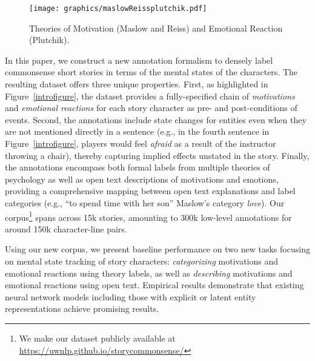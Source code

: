 \documentclass[11pt,a4paper]{article}
\begin{document}
\begin{figure*}[t]
    \centering
    \hspace{-25pt}
    \texttt{[image: graphics/maslowReissplutchik.pdf]}
    \vspace*{-6mm}
    \caption{Theories of Motivation (Maslow and Reiss) and Emotional Reaction (Plutchik).}
    \label{fig:annot_categories}
\end{figure*}

In this paper, we construct a new annotation formalism to densely label commonsense short stories \citep{Mostafazadeh2016-ei} in terms of the mental states of the characters. 
The resulting dataset offers three unique properties. 
First, as highlighted in Figure~\ref{introfigure}, the dataset provides a fully-specified chain of \emph{motivations} and \emph{emotional reactions} for each story character as pre- and post-conditions of events. Second, the annotations include state changes for entities even when they are not mentioned directly in a sentence (e.g., in the fourth sentence in Figure~\ref{introfigure},  
players would feel \emph{afraid} as a result of the instructor throwing a chair), thereby capturing implied effects unstated in the story. Finally, the annotations encompass both formal labels from multiple theories of psychology \cite{Maslow1943rl,Reiss2004ex,Plutchik1980jg} as well as open text descriptions of motivations and emotions, providing a comprehensive mapping between open text explanations and label categories (e.g., ``to spend time with her son''  Maslow's category \textit{love}).  
Our corpus\footnote{We make our dataset publicly available at \url{https://uwnlp.github.io/storycommonsense/}} spans across 15k stories, amounting to 300k low-level annotations for around 150k character-line pairs.  











Using our new corpus, we present baseline performance on two new tasks focusing on mental state tracking of story characters: \emph{categorizing} motivations and emotional reactions using theory labels, as well as \emph{describing} motivations and emotional reactions using open text.  Empirical results demonstrate that existing neural network models including those with explicit or latent entity representations achieve promising results.
\end{document}
